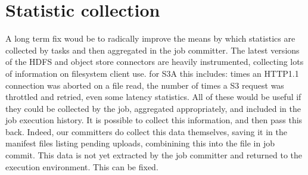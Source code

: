 \documentclass{article}
\begin{document}
\section{Statistic collection}

A long term fix woud be to radically improve the means by which statistics are
collected by tasks and then aggregated in the job committer.
The latest versions of the HDFS and object store connectors are heavily instrumented,
collecting lots of information on filesystem client use.
for S3A this includes: times an HTTP1.1 connection was aborted on a file read,
the number of times a S3 request was throttled and retried,
even some latency statistics.
All of these would be useful if they could be collected by the job, aggregated
appropriately, and included in the job execution history.
It is possible to collect this information, and then pass this back.
Indeed, our committers do collect this data themselves, saving it in the
manifest files listing pending uploads, combinining this into the \SUCCESS file
in job commit.
This data is not yet extracted by the job committer and returned to the execution
environment.
This can be fixed.
\end{document}
